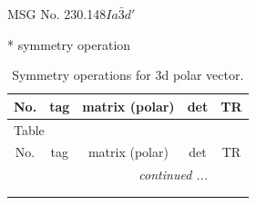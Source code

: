 \documentclass[fleqn,8pt]{jsarticle}
\begin{document}
\setcounter{MaxMatrixCols}{32}

\renewcommand{\tablename}{Table~}
\renewcommand{\figurename}{Figure~}
\begin{center}
\LARGE
MSG No. 230.148\quad$Ia\bar{3}d'$
\end{center}
* symmetry operation
\renewcommand{\arraystretch}{1.3}
\begin{longtable}{ccccc}
\caption{Symmetry operations for 3d polar vector.}
 \\
 \hline \hline
No. & tag & matrix (polar) & det & TR \\ \hline \endfirsthead

\multicolumn{4}{l}{\tablename\ \thetable{}} \\
 \hline \hline
No. & tag & matrix (polar) & det & TR \\ \hline \endhead

 \hline \hline
\multicolumn{4}{r}{\footnotesize\it continued ...} \\ \endfoot

 \hline \hline
\multicolumn{4}{r}{} \\ \endlastfoot


\end{longtable}
\end{document}
